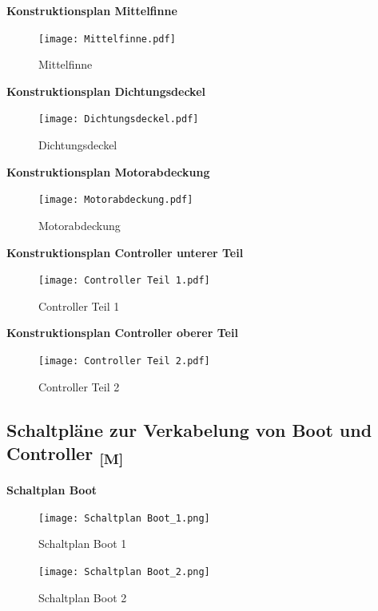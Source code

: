 \documentclass[a4paper,12pt]{article}
\begin{document}
\textbf{Konstruktionsplan Mittelfinne}

\begin{figure}[H]
    \centering
    \texttt{[image: Mittelfinne.pdf]}
    \caption{Mittelfinne}
    \label{fig:Mittelfinne}
\end{figure}

\textbf{Konstruktionsplan Dichtungsdeckel}

\begin{figure}[H]
    \centering
    \texttt{[image: Dichtungsdeckel.pdf]}
    \caption{Dichtungsdeckel}
    \label{fig:Dichtungsdeckel}
\end{figure}

\textbf{Konstruktionsplan Motorabdeckung}

\begin{figure}[H]
    \centering
    \texttt{[image: Motorabdeckung.pdf]}
    \caption{Motorabdeckung}
    \label{fig:Motorabdeckung}
\end{figure}

\textbf{Konstruktionsplan Controller unterer Teil}

\begin{figure}[H]
    \centering
    \texttt{[image: Controller Teil 1.pdf]}
    \caption{Controller Teil 1}
    \label{fig:Controller Teil 1}
\end{figure}

\textbf{Konstruktionsplan Controller oberer Teil}

\begin{figure}[H]
    \centering
    \texttt{[image: Controller Teil 2.pdf]}
    \caption{Controller Teil 2}
    \label{fig:Controller Teil 2}
\end{figure}


\subsection{\texorpdfstring{Schaltpläne zur Verkabelung von Boot und Controller \textsubscript{[M]}}{Schaltpläne zur Verkabelung von Boot und Controller [M]}}

\textbf{Schaltplan Boot}

\begin{figure}[H]
    \centering
    \texttt{[image: Schaltplan Boot\_1.png]}
    \caption{Schaltplan Boot 1}
    \label{fig:Schaltplan Boot 1}
\end{figure}

\begin{figure}[H]
    \centering
    \texttt{[image: Schaltplan Boot\_2.png]}
    \caption{Schaltplan Boot 2}
    \label{fig:Schaltplan Boot 2}
\end{figure}
\end{document}
